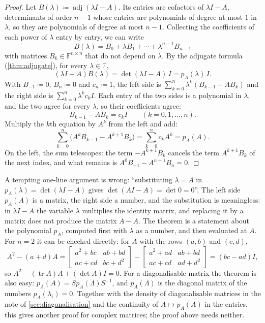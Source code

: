 \begin{proof}
Let $B(\lambda)\coloneqq\operatorname{adj}(\lambda I-A)$. Its entries are cofactors of $\lambda I-A$, determinants of order $n-1$ whose entries are polynomials of degree at most $1$ in $\lambda$, so they are polynomials of degree at most $n-1$. Collecting the coefficients of each power of $\lambda$ entry by entry, we can write
\[
B(\lambda)=B_0+\lambda B_1+\cdots+\lambda^{n-1}B_{n-1}
\]
with matrices $B_k\in\mathbb F^{n\times n}$ that do not depend on $\lambda$. By the adjugate formula (\cref{thm:adjugate}), for every $\lambda\in\mathbb F$,
\[
(\lambda I-A)B(\lambda)=\det(\lambda I-A)\,I=p_A(\lambda)\,I .
\]
With $B_{-1}\coloneqq0$, $B_n\coloneqq0$ and $c_n\coloneqq1$, the left side is $\sum_{k=0}^n\lambda^k(B_{k-1}-AB_k)$ and the right side is $\sum_{k=0}^n\lambda^kc_kI$. Each entry of the two sides is a polynomial in $\lambda$, and the two agree for every $\lambda$, so their coefficients agree:
\[
B_{k-1}-AB_k=c_kI\qquad(k=0,1,\ldots,n).
\]
Multiply the $k$th equation by $A^k$ from the left and add:
\[
\sum_{k=0}^n\bigl(A^kB_{k-1}-A^{k+1}B_k\bigr)=\sum_{k=0}^nc_kA^k=p_A(A).
\]
On the left, the sum telescopes: the term $-A^{k+1}B_k$ cancels the term $A^{k+1}B_k$ of the next index, and what remains is $A^0B_{-1}-A^{n+1}B_n=0$.
\end{proof}

A tempting one-line argument is wrong: ``substituting $\lambda=A$ in $p_A(\lambda)=\det(\lambda I-A)$ gives $\det(AI-A)=\det0=0$''. The left side $p_A(A)$ is a matrix, the right side a number, and the substitution is meaningless: in $\lambda I-A$ the variable $\lambda$ multiplies the identity matrix, and replacing it by a matrix does not produce the matrix $A-A$. The theorem is a statement about the polynomial $p_A$, computed first with $\lambda$ as a number, and then evaluated at $A$. For $n=2$ it can be checked directly: for $A$ with the rows $(a,b)$ and $(c,d)$,
\[
A^2-(a+d)A=\begin{bmatrix}a^2+bc&ab+bd\\ac+cd&bc+d^2\end{bmatrix}-\begin{bmatrix}a^2+ad&ab+bd\\ac+cd&ad+d^2\end{bmatrix}=(bc-ad)I ,
\]
so $A^2-(\operatorname{tr}A)A+(\det A)I=0$. For a diagonalisable matrix the theorem is also easy: $p_A(A)=Sp_A(\Lambda)S^{-1}$, and $p_A(\Lambda)$ is the diagonal matrix of the numbers $p_A(\lambda_i)=0$. Together with the density of diagonalisable matrices in the note of \cref{sec:diagonalisation} and the continuity of $A\mapsto p_A(A)$ in the entries, this gives another proof for complex matrices; the proof above needs neither.

